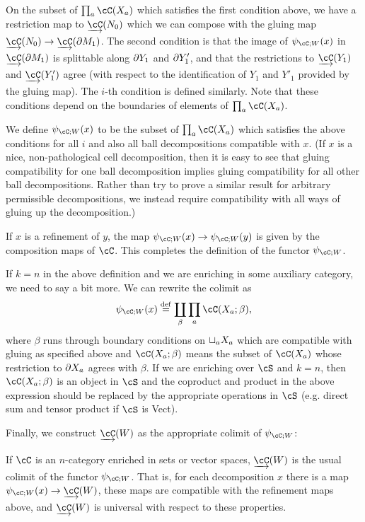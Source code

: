 On the subset of $\prod_a \cC(X_a)$ which satisfies the first condition above, we have a restriction
map to $\cl\cC(N_0)$ which we can compose with the gluing map 
$\cl\cC(N_0) \to \cl\cC(\bd M_1)$.
The second condition is that the image of $\psi_{\cC;W}(x)$ in $\cl\cC(\bd M_1)$ is splittable
along $\partial Y_1$ and $\partial Y'_1$, and that the restrictions to $\cl\cC(Y_1)$ and $\cl\cC(Y'_1)$ agree
(with respect to the identification of $Y_1$ and $Y'_1$ provided by the gluing map). 
The $i$-th condition is defined similarly.
Note that these conditions depend on the boundaries of elements of $\prod_a \cC(X_a)$.

We define $\psi_{\cC;W}(x)$ to be the subset of $\prod_a \cC(X_a)$ which satisfies the 
above conditions for all $i$ and also all 
ball decompositions compatible with $x$.
(If $x$ is a nice, non-pathological cell decomposition, then it is easy to see that gluing
compatibility for one ball decomposition implies gluing compatibility for all other ball decompositions.
Rather than try to prove a similar result for arbitrary
permissible decompositions, we instead require compatibility with all ways of gluing up the decomposition.)

If $x$ is a refinement of $y$, the map $\psi_{\cC;W}(x) \to \psi_{\cC;W}(y)$ 
is given by the composition maps of $\cC$.
This completes the definition of the functor $\psi_{\cC;W}$.

If $k=n$ in the above definition and we are enriching in some auxiliary category, 
we need to say a bit more.
We can rewrite the colimit as
\[  %
	\psi_{\cC;W}(x) \deq \coprod_\beta \prod_a \cC(X_a; \beta) ,
\]  %
where $\beta$ runs through 
boundary conditions on $\sqcup_a X_a$ which are compatible with gluing as specified above
and $\cC(X_a; \beta)$
means the subset of $\cC(X_a)$ whose restriction to $\partial X_a$ agrees with $\beta$.
If we are enriching over $\cS$ and $k=n$, then $\cC(X_a; \beta)$ is an object in 
$\cS$ and the coproduct and product in the above expression should be replaced by the appropriate
operations in $\cS$ (e.g. direct sum and tensor product if $\cS$ is Vect).

Finally, we construct $\cl{\cC}(W)$ as the appropriate colimit of $\psi_{\cC;W}$:

\begin{defn}
\label{def:colim-fields}
If $\cC$ is an $n$-category enriched in sets or vector spaces, $\cl{\cC}(W)$ is the usual colimit of the functor $\psi_{\cC;W}$.
That is, for each decomposition $x$ there is a map
$\psi_{\cC;W}(x)\to \cl{\cC}(W)$, these maps are compatible with the refinement maps
above, and $\cl{\cC}(W)$ is universal with respect to these properties.
\end{defn}

